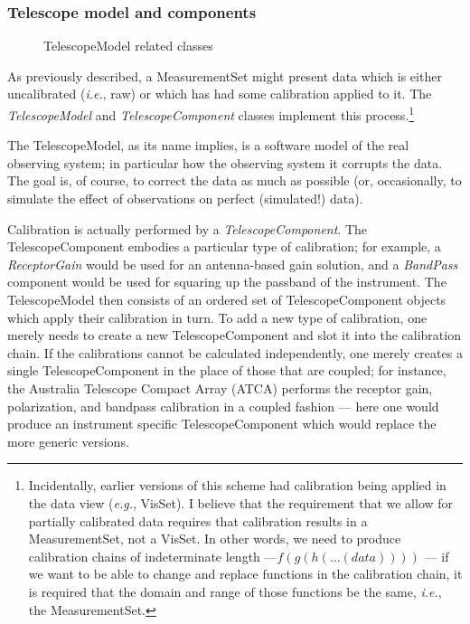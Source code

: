 \subsubsection{Telescope model and components}
\label{sec:TelescopeModel}

\begin{figure}
\epsfverbosetrue
\epsfysize=4.5in
\caption{TelescopeModel related classes}
\end{figure}

As previously described, a MeasurementSet might present data which is
either uncalibrated ({\em i.e.}, raw) or which has had some
calibration applied to it. The {\em TelescopeModel} and {\em
TelescopeComponent} classes implement this
process.\footnote{Incidentally, earlier versions of this scheme had
calibration being applied in the data view ({\em e.g.}, VisSet). I
believe that the requirement that we allow for partially calibrated
data requires that calibration results in a MeasurementSet, not a
VisSet. In other words, we need to produce calibration chains of
indeterminate length ---$f(g(h(\ldots(data))))$ --- if we want to be
able to change and replace functions in the calibration chain, it is
required that the domain and range of those functions be the same,
{\em i.e.}, the MeasurementSet.}

The TelescopeModel, as its name implies, is a software model of the
real observing system; in particular how the observing system it
corrupts the data. The goal is, of course, to correct the data as much
as possible (or, occasionally, to simulate the effect of observations
on perfect (simulated!) data).

Calibration is actually performed by a {\em TelescopeComponent}. The
TelescopeComponent embodies a particular type of calibration; for
example, a {\em ReceptorGain} would be used for an antenna-based gain
solution, and a {\em BandPass} component would be used for squaring
up the passband of the instrument. The TelescopeModel then consists of
an ordered set of TelescopeComponent objects which apply their
calibration in turn. To add a new type of calibration, one merely
needs to create a new TelescopeComponent and slot it into the
calibration chain. If the calibrations cannot be calculated
independently, one merely creates a single TelescopeComponent in the
place of those that are coupled; for instance, the Australia Telescope
Compact Array (ATCA) performs the receptor gain, polarization, and
bandpass calibration in a coupled fashion --- here one would produce
an instrument specific TelescopeComponent which would replace the more
generic versions.

